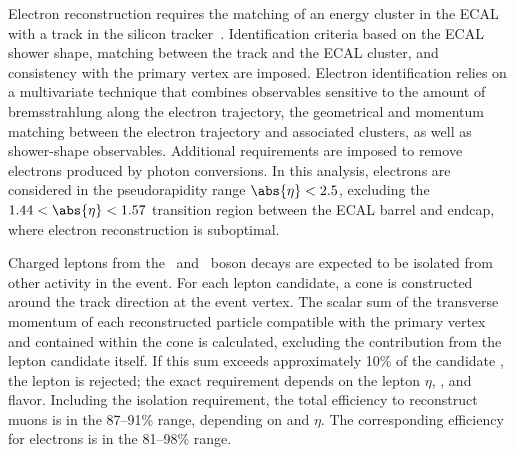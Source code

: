 \documentclass[12pt,twoside,a4paper,cmspaper,final,collab]{cms-tdr}
\begin{document}
Electron reconstruction requires the matching
of an energy cluster in the ECAL with a track in the silicon
tracker~\cite{CMS-PAS-EGM-10-004}. Identification criteria based on the ECAL
shower shape, matching between the track and the ECAL cluster, and consistency with the
primary vertex are imposed. Electron identification relies on a
multivariate technique that combines observables sensitive to the
amount of bremsstrahlung along the electron trajectory, the
geometrical and momentum matching between the electron trajectory and
associated clusters, as well as shower-shape observables. Additional requirements are imposed to remove electrons
produced by photon conversions. In this analysis, electrons are
considered in the pseudorapidity range $\abs{\eta} < 2.5$,
excluding the  $1.44 < \abs{\eta}< 1.57$ transition
region between the ECAL barrel and endcap, where electron
reconstruction is suboptimal.


Charged leptons from the \PW\ and \cPZ\  boson decays are expected to be isolated
from other activity in the event. For each lepton candidate, a cone
is constructed around the track direction at the event vertex.  The scalar
sum of the transverse momentum of each reconstructed
particle compatible with the primary vertex and contained within the cone is calculated,
excluding the contribution from the lepton candidate itself. If this
sum exceeds approximately 10\% of the candidate \pt, the lepton is
rejected; the exact requirement depends on the lepton $\eta$, \pt,
and flavor. Including the isolation requirement, the total efficiency to reconstruct
muons is in the 87--91\% range, depending on \pt and $\eta$. The
corresponding efficiency for electrons is in the 81--98\% range.
\end{document}
